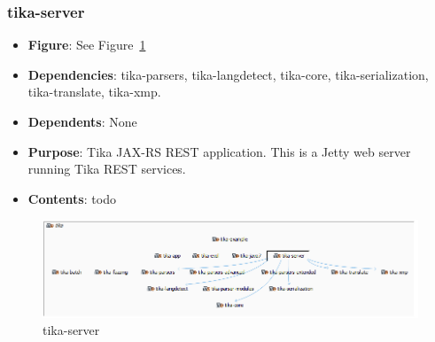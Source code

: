 \documentclass{article}
\begin{document}
\subsubsection{tika-server}
\begin {itemize}
\item \textbf{Figure}: See Figure~\ref{fig:tika-server}
\item \textbf{Dependencies}: tika-parsers, tika-langdetect, tika-core, tika-serialization, tika-translate, tika-xmp.
\item \textbf{Dependents}: None
\item \textbf{Purpose}: Tika JAX-RS REST application. This is a Jetty web server running Tika REST services.
\item \textbf{Contents}: todo
\end{itemize}
\begin{figure}[ht]
    \centering
    \includegraphics[width=1\textwidth]{report/images/tika-server.PNG}
    \caption{tika-server}
    \label{fig:tika-server}
\end{figure}
\end{document}
